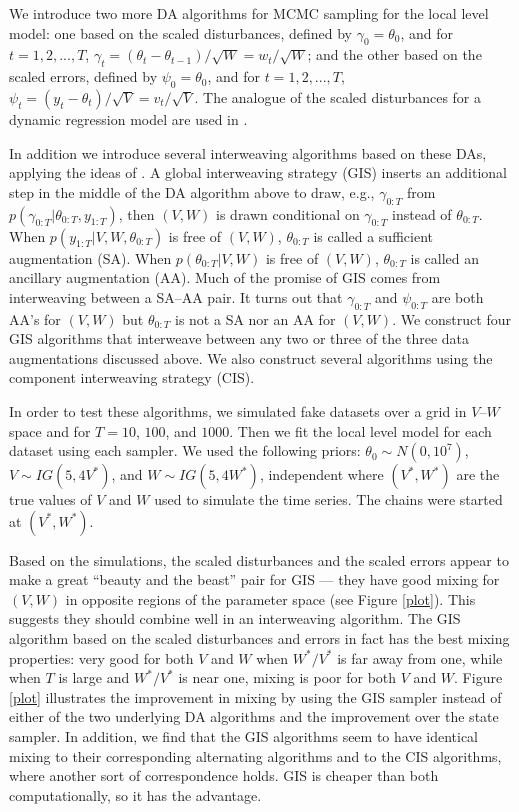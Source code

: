 \documentclass{article}\usepackage{graphicx, color}
\begin{document}
We introduce two more DA algorithms for MCMC sampling for the local level model: one based on the scaled disturbances, defined by $\gamma_0 = \theta_0$, and for $t=1,2,...,T$, $\gamma_t = (\theta_t - \theta_{t-1})/\sqrt{W}=w_t/\sqrt{W}$; and the other based on the scaled errors, defined by $\psi_0=\theta_0$, and for $t=1,2,...,T$, $\psi_t = (y_t - \theta_{t})/\sqrt{V}=v_t/\sqrt{V}$. The analogue of the scaled disturbances for a dynamic regression model are used in \cite{fruhwirth2004efficient}.

In addition we introduce several interweaving algorithms based on these DAs, applying the ideas of \cite{yu2011center}. A global interweaving strategy (GIS) inserts an additional step in the middle of the DA algorithm above to draw, e.g., $\gamma_{0:T}$ from $p(\gamma_{0:T}|\theta_{0:T},y_{1:T})$, then $(V,W)$ is drawn conditional on $\gamma_{0:T}$ instead of $\theta_{0:T}$. When $p(y_{1:T}|V,W,\theta_{0:T})$ is free of $(V,W)$, $\theta_{0:T}$ is called a sufficient augmentation (SA). When $p(\theta_{0:T}|V,W)$ is free of $(V,W)$, $\theta_{0:T}$ is called an ancillary augmentation (AA). Much of the promise of GIS comes from interweaving between a SA--AA pair. It turns out that $\gamma_{0:T}$ and $\psi_{0:T}$ are both AA's for $(V,W)$ but $\theta_{0:T}$ is not a SA nor an AA for $(V,W)$. We construct four GIS algorithms that interweave between any two or three of the three data augmentations discussed above. We also construct several algorithms using the component interweaving strategy (CIS). 

In order to test these algorithms, we simulated fake datasets over a grid in $V$--$W$ space and for $T=10$, $100$, and $1000$. Then we fit the local level model for each dataset using each sampler. We used the following priors: $\theta_0\sim N(0,10^7)$, $V\sim IG(5, 4V^*)$, and $W\sim IG(5, 4W^*)$,  independent where  $(V^*,W^*)$ are the true values of $V$ and $W$ used to simulate the time series. The chains were started at $(V^*,W^*)$.

Based on the simulations, the scaled disturbances and the scaled errors appear to make a great ``beauty and the beast'' pair for GIS --- they have good mixing for $(V,W)$ in opposite regions of the parameter space (see Figure \ref{plot}). This suggests they should combine well in an interweaving algorithm. The GIS algorithm based on the scaled disturbances and errors in fact has the best mixing properties: very good for both $V$ and $W$ when $W^*/V^*$ is far away from one, while when $T$ is large and $W^*/V^*$ is near one, mixing is poor for both $V$ and $W$. Figure \ref{plot} illustrates the improvement in mixing by using the GIS sampler instead of either of the two underlying DA algorithms and the improvement over the state sampler. In addition, we find that the GIS algorithms seem to have identical mixing to their corresponding alternating algorithms and to the CIS algorithms, where another sort of correspondence holds. GIS is cheaper than both computationally, so it has the advantage.
\end{document}
